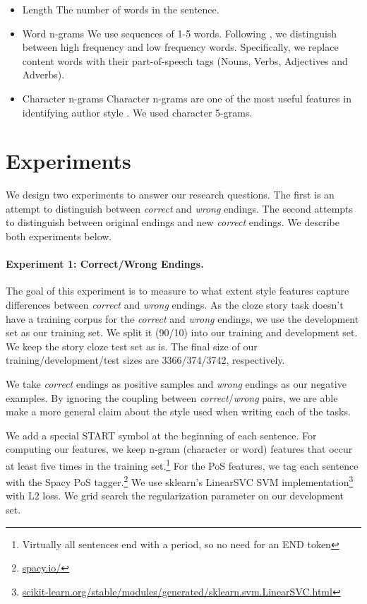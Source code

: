 \documentclass[11pt,a4paper]{article}
\newcommand{\isectionb}[1]{\section{#1}\label{ssec:#1}}
\begin{document}
\begin{itemize}
\item{Length} The number of words in the sentence.
\item{Word n-grams} We use sequences of 1-5 words. Following \cite{Tsur:2010,Schwartz:2013}, we distinguish between high frequency and low frequency words. 
Specifically, we replace content words with their part-of-speech tags (Nouns, Verbs, Adjectives and Adverbs).
\item{Character n-grams} Character n-grams are one of the most useful features in identifying author style \cite{Stamatatos:2009}. 
We used character 5-grams.
\end{itemize}

\isectionb{Experiments}
We design two experiments to answer our research questions. 
The first is an attempt to distinguish between {\it correct} and {\it wrong} endings.
The second attempts to distinguish between original endings and new {\it correct} endings.
We describe both experiments below.

\paragraph{Experiment 1: Correct/Wrong Endings.}
The goal of this experiment is to measure to what extent  style features capture differences between {\it correct} and {\it wrong} endings.
As the cloze story task doesn't have a training corpus for the {\it correct} and {\it wrong} endings, we use the development set as our training set. 
We split it (90/10) into our training and development set. We keep the story cloze test set as is.
The final size of our training/development/test sizes are 3366/374/3742, respectively. 

We take  {\it correct} endings as positive samples and {\it wrong} endings as our negative examples. 
By ignoring the coupling between {\it correct}/{\it wrong} pairs, we are able make a more general claim about the style used when writing each of the tasks.

We add a special START symbol at the beginning of each sentence. 
For computing our features, we keep n-gram (character or word) features that occur at least five times in the training set.\footnote{Virtually all sentences end with a period, so no need for an END token}
For the PoS features, we tag each sentence with the Spacy PoS tagger.\footnote{\url{spacy.io/}}
We use  sklearn's LinearSVC SVM implementation\footnote{\url{scikit-learn.org/stable/modules/generated/sklearn.svm.LinearSVC.html}} 
with L2 loss. We grid search the regularization parameter on our development set. 
\end{document}
